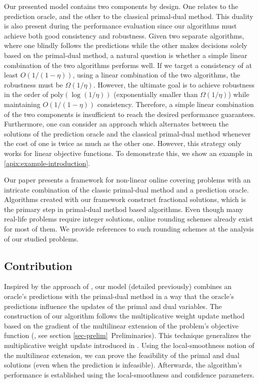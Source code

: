 Our presented model contains two components by design. One relates to the prediction oracle, and the other to the classical primal-dual method. This duality is also present during the performance evaluation since our algorithms must achieve both good consistency and robustness. Given two separate algorithms, where one blindly follows the predictions while the other makes decisions solely based on the primal-dual method, a natural question is whether a simple linear combination of the two algorithms performs well. If we target a consistency of at least $O(1/(1-\eta))$, using a linear combination of the two algorithms, the robustness must be $\Omega(1/\eta)$. However, the ultimate goal is to achieve robustness in the order of $\text{poly}(\log(1/\eta))$ (exponentially smaller than $\Omega(1/\eta)$) while maintaining $O(1/(1-\eta))$ consistency. Therefore, a simple linear combination of the two components is insufficient to reach the desired performance guarantees. Furthermore, one can consider an approach which alternates between the solutions of the prediction oracle and the classical primal-dual method whenever the cost of one is twice as much as the other one. However, this strategy only works for linear objective functions. To demonstrate this, we show an example in \cref{apix:example-introduction}.

Our paper presents a framework for non-linear online covering problems with an intricate combination of the classic primal-dual method and a prediction oracle. Algorithms created with our framework construct fractional solutions, which is the primary step in primal-dual method based algorithms. Even though many real-life problems require integer solutions, online rounding schemes already exist for most of them.   We provide references to such rounding schemes at the analysis of our studied problems.


\subsection{Contribution}  \label{sec:intro-covering}

Inspired by the approach of \cite{BamasMaggiori20:The-Primal-Dual-method}, our model (detailed previously) combines an oracle's predictions with the primal-dual method in a way that the oracle's predictions influence the updates of the primal and dual variables. The construction of our algorithm follows the multiplicative weight update method based on the gradient of the multilinear extension of the problem's objective function (\cite{Thang20:Online-Primal-Dual}, see section \ref{sec-prelim}~Preliminaries). This technique generalizes the multiplicative weight update introduced in \cite{BuchbinderNaor09:The-Design-of-Competitive,AzarBuchbinder16:Online-Algorithms}. Using the local-smoothness notion of the multilinear extension, we can prove the feasibility of the primal and dual solutions (even when the prediction is infeasible). Afterwards, the algorithm's performance is established using the local-smoothness and confidence parameters.


